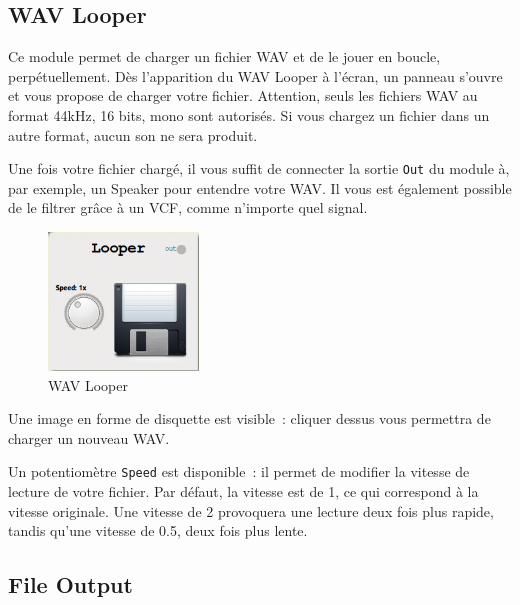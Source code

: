\documentclass[a4paper,oneside,frenchb,10pt]{article}
\begin{document}
\subsection{WAV Looper}

\begin{multicols}{2}
Ce module permet de charger un fichier WAV et de le jouer en boucle,
perpétuellement. Dès l'apparition du WAV Looper à l'écran, un panneau
s'ouvre et vous propose de charger votre fichier. Attention, seuls
les fichiers WAV au format 44kHz, 16 bits, mono sont autorisés. Si vous
chargez un fichier dans un autre format, aucun son ne sera produit.

Une fois votre fichier chargé, il vous suffit de connecter la sortie
\verb!Out! du module à, par exemple, un Speaker pour entendre votre WAV.
Il vous est également possible de le filtrer grâce à un VCF, comme
n'importe quel signal.

\begin{figure}[H]
\centering
\includegraphics[width=4cm]{../img/png/wavlooper.png}
\caption{WAV Looper}
\end{figure}
\end{multicols}

Une image en forme de disquette est visible~: cliquer dessus vous
permettra de charger un nouveau WAV.

Un potentiomètre \verb!Speed! est disponible~: il permet de modifier la
vitesse de lecture de votre fichier. Par défaut, la vitesse est de 1, ce
qui correspond à la vitesse originale. Une vitesse de 2 provoquera une
lecture deux fois plus rapide, tandis qu'une vitesse de 0.5, deux fois
plus lente.

\subsection{File Output}
\end{document}
